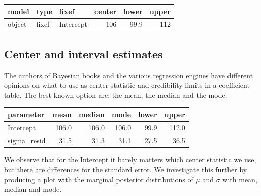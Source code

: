 \documentclass[]{svmono}
\newenvironment{Shaded}{\begin{snugshade}}{\end{snugshade}}
\newcommand{\KeywordTok}[1]{\textcolor[rgb]{0.13,0.29,0.53}{\textbf{#1}}}
\newcommand{\DataTypeTok}[1]{\textcolor[rgb]{0.13,0.29,0.53}{#1}}
\newcommand{\DecValTok}[1]{\textcolor[rgb]{0.00,0.00,0.81}{#1}}
\newcommand{\StringTok}[1]{\textcolor[rgb]{0.31,0.60,0.02}{#1}}
\newcommand{\OperatorTok}[1]{\textcolor[rgb]{0.81,0.36,0.00}{\textbf{#1}}}
\newcommand{\NormalTok}[1]{#1}
\begin{document}
\begin{longtable}[]{@{}lllrrr@{}}
\toprule
model & type & fixef & center & lower & upper\tabularnewline
\midrule
\endhead
object & fixef & Intercept & 106 & 99.9 & 112\tabularnewline
\bottomrule
\end{longtable}

\subsection{Center and interval
estimates}\label{center-and-interval-estimates}

The authors of Bayesian books and the various regression engines have
different opinions on what to use as center statistic and credibility
limits in a coefficient table. The best known option are: the mean, the
median and the mode.

\begin{Shaded}
\end{Shaded}

\begin{tabular}{l|r|r|r|r|r}
\hline
parameter & mean & median & mode & lower & upper\\
\hline
Intercept & 106.0 & 106.0 & 106.0 & 99.9 & 112.0\\
\hline
sigma\_resid & 31.5 & 31.3 & 31.1 & 27.5 & 36.5\\
\hline
\end{tabular}

We observe that for the Intercept it barely matters which center
statistic we use, but there are differences for the standard error. We
investigate this further by producing a plot with the marginal posterior
distributions of \(\mu\) and \(\sigma\) with mean, median and mode.
\end{document}

